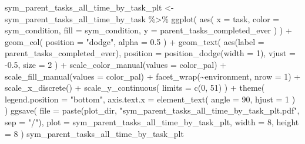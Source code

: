 \documentclass[
]{book}
\newenvironment{Shaded}{\begin{snugshade}}{\end{snugshade}}
\newcommand{\AttributeTok}[1]{\textcolor[rgb]{0.77,0.63,0.00}{#1}}
\newcommand{\DecValTok}[1]{\textcolor[rgb]{0.00,0.00,0.81}{#1}}
\newcommand{\FloatTok}[1]{\textcolor[rgb]{0.00,0.00,0.81}{#1}}
\newcommand{\FunctionTok}[1]{\textcolor[rgb]{0.00,0.00,0.00}{#1}}
\newcommand{\NormalTok}[1]{#1}
\newcommand{\OtherTok}[1]{\textcolor[rgb]{0.56,0.35,0.01}{#1}}
\newcommand{\SpecialCharTok}[1]{\textcolor[rgb]{0.00,0.00,0.00}{#1}}
\newcommand{\StringTok}[1]{\textcolor[rgb]{0.31,0.60,0.02}{#1}}
\begin{document}
\begin{Shaded}
\begin{Highlighting}[]
\NormalTok{sym\_parent\_tasks\_all\_time\_by\_task\_plt }\OtherTok{\textless{}{-}}\NormalTok{ sym\_parent\_tasks\_all\_time\_by\_task }\SpecialCharTok{\%\textgreater{}\%}
  \FunctionTok{ggplot}\NormalTok{(}
    \FunctionTok{aes}\NormalTok{(}
      \AttributeTok{x =}\NormalTok{ task,}
      \AttributeTok{color =}\NormalTok{ sym\_condition,}
      \AttributeTok{fill =}\NormalTok{ sym\_condition,}
      \AttributeTok{y =}\NormalTok{ parent\_tasks\_completed\_ever}
\NormalTok{    )}
\NormalTok{  ) }\SpecialCharTok{+}
  \FunctionTok{geom\_col}\NormalTok{(}
    \AttributeTok{position =} \StringTok{"dodge"}\NormalTok{,}
    \AttributeTok{alpha =} \FloatTok{0.5}
\NormalTok{  ) }\SpecialCharTok{+}
  \FunctionTok{geom\_text}\NormalTok{(}
    \FunctionTok{aes}\NormalTok{(}\AttributeTok{label =}\NormalTok{ parent\_tasks\_completed\_ever),}
    \AttributeTok{position =} \FunctionTok{position\_dodge}\NormalTok{(}\AttributeTok{width =} \DecValTok{1}\NormalTok{),}
    \AttributeTok{vjust =} \SpecialCharTok{{-}}\FloatTok{0.5}\NormalTok{,}
    \AttributeTok{size =} \DecValTok{2}
\NormalTok{  ) }\SpecialCharTok{+}
  \FunctionTok{scale\_color\_manual}\NormalTok{(}\AttributeTok{values =}\NormalTok{ color\_pal) }\SpecialCharTok{+}
  \FunctionTok{scale\_fill\_manual}\NormalTok{(}\AttributeTok{values =}\NormalTok{ color\_pal) }\SpecialCharTok{+}
  \FunctionTok{facet\_wrap}\NormalTok{(}\SpecialCharTok{\textasciitilde{}}\NormalTok{environment, }\AttributeTok{nrow =} \DecValTok{1}\NormalTok{) }\SpecialCharTok{+}
  \FunctionTok{scale\_x\_discrete}\NormalTok{() }\SpecialCharTok{+}
  \FunctionTok{scale\_y\_continuous}\NormalTok{(}
    \AttributeTok{limits =} \FunctionTok{c}\NormalTok{(}\DecValTok{0}\NormalTok{, }\DecValTok{51}\NormalTok{)}
\NormalTok{  ) }\SpecialCharTok{+}
  \FunctionTok{theme}\NormalTok{(}
    \AttributeTok{legend.position =} \StringTok{"bottom"}\NormalTok{,}
    \AttributeTok{axis.text.x =} \FunctionTok{element\_text}\NormalTok{(}
      \AttributeTok{angle =} \DecValTok{90}\NormalTok{,}
      \AttributeTok{hjust =} \DecValTok{1}
\NormalTok{    )}
\NormalTok{  )}
\FunctionTok{ggsave}\NormalTok{(}
  \AttributeTok{file =} \FunctionTok{paste}\NormalTok{(plot\_dir, }\StringTok{"sym\_parent\_tasks\_all\_time\_by\_task\_plt.pdf"}\NormalTok{, }\AttributeTok{sep =} \StringTok{"/"}\NormalTok{),}
  \AttributeTok{plot =}\NormalTok{ sym\_parent\_tasks\_all\_time\_by\_task\_plt,}
  \AttributeTok{width =} \DecValTok{8}\NormalTok{,}
  \AttributeTok{height =} \DecValTok{8}
\NormalTok{)}
\NormalTok{sym\_parent\_tasks\_all\_time\_by\_task\_plt}
\end{Highlighting}
\end{Shaded}
\end{document}
